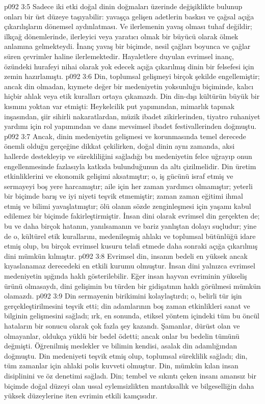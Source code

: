 \vs p092 3:5 Sadece iki etki doğal dinin doğmaları üzerinde değişiklikte bulunup onları bir üst düzeye taşıyabilir: yavaşça gelişen adetlerin baskısı ve çağsal açığa çıkarılışların dönemsel aydınlatması. Ve ilerlemenin yavaş olması tuhaf değildir; ilkçağ dönemlerinde, ilerleyici veya yaratıcı olmak bir büyücü olarak ölmek anlamına gelmekteydi. İnanç yavaş bir biçimde, nesil çağları boyunca ve çağlar süren çevrimler haline ilerlemektedir. Hayaletlere duyulan evrimsel inanç, özündeki hurafeyi nihai olarak yok edecek açığa çıkarılmış dinin bir felsefesi için zemin hazırlamıştı.
\vs p092 3:6 Din, toplumsal gelişmeyi birçok şekilde engellemiştir; ancak din olmadan, kıymete değer bir medeniyetin yoksunluğu biçiminde, kalıcı hiçbir ahlak veya etik kuralları ortaya çıkamazdı. Din din\hyp{}dışı kültürün büyük bir kısmını yoktan var etmişti: Heykelcilik put yapımından, mimarlık tapınak inşasından, şiir sihirli nakaratlardan, müzik ibadet zikirlerinden, tiyatro ruhaniyet yardımı için rol yapımından ve dans mevsimsel ibadet festivallerinden doğmuştu.
\vs p092 3:7 Ancak, dinin medeniyetin gelişmesi ve korunmasında temel derecede önemli olduğu gerçeğine dikkat çekilirken, doğal dinin aynı zamanda, aksi hallerde destekleyip ve sürekliliğini sağladığı bu medeniyetin felce uğrayıp onun engellenmesinde fazlasıyla katkıda bulunduğunun da altı çizilmelidir. Din üretim etkinliklerini ve ekonomik gelişimi aksatmıştır; o, iş gücünü israf etmiş ve sermayeyi boş yere harcamıştır; aile için her zaman yardımcı olmamıştır; yeterli bir biçimde barış ve iyi niyeti teşvik etmemiştir; zaman zaman eğitimi ihmal etmiş ve bilimi yavaşlatmıştır; ölü olanın sözde zenginleşmesi için yaşamı kabul edilemez bir biçimde fakirleştirmiştir. İnsan dini olarak evrimsel din gerçekten de; bu ve daha birçok hatanın, yanılsamanın ve bariz yanlıştan dolayı suçludur; yine de o, kültürel etik kurallarını, medenileşmiş ahlakı ve toplumsal bütünlüğü idare etmiş olup, bu birçok evrimsel kusuru telafi etmede daha sonraki açığa çıkarılmış dini mümkün kılmıştır.
\vs p092 3:8 Evrimsel din, insanın bedeli en yüksek ancak kıyaslanamaz derecedeki en etkili kurumu olmuştur. İnsan dini yalnızca evrimsel medeniyetin ışığında haklı gösterilebilir. Eğer insan hayvan evriminin yükseliş ürünü olmasaydı, dini gelişimin bu türden bir gidişatının haklı görülmesi mümkün olamazdı.
\vs p092 3:9 Din sermayenin birikimini kolaylaştırdı; o, belirli tür işin gerçekleştirilmesini teşvik etti; din adamlarının boş zaman etkinlikleri sanat ve bilginin gelişmesini sağladı; ırk, en sonunda, etiksel yöntem içindeki tüm bu öncül hataların bir sonucu olarak çok fazla şey kazandı. Şamanlar, dürüst olan ve olmayanlar, oldukça yüklü bir bedel ödetti; ancak onlar bu bedelin tümünü değmişti. Öğrenilmiş meslekler ve bilimin kendisi, asalak din adamlığından doğmuştu. Din medeniyeti teşvik etmiş olup, toplumsal süreklilik sağladı; din, tüm zamanlar için ahlaki polis kuvveti olmuştur. Din,  mümkün kılan insan disiplinini ve öz denetimi sağladı. Din; tembel ve sıkıntı çeken insanı amansız bir biçimde doğal düzeyi olan ussal eylemsizlikten mantıksallık ve bilgeselliğin daha yüksek düzeylerine iten evrimin etkili kamçısıdır.
